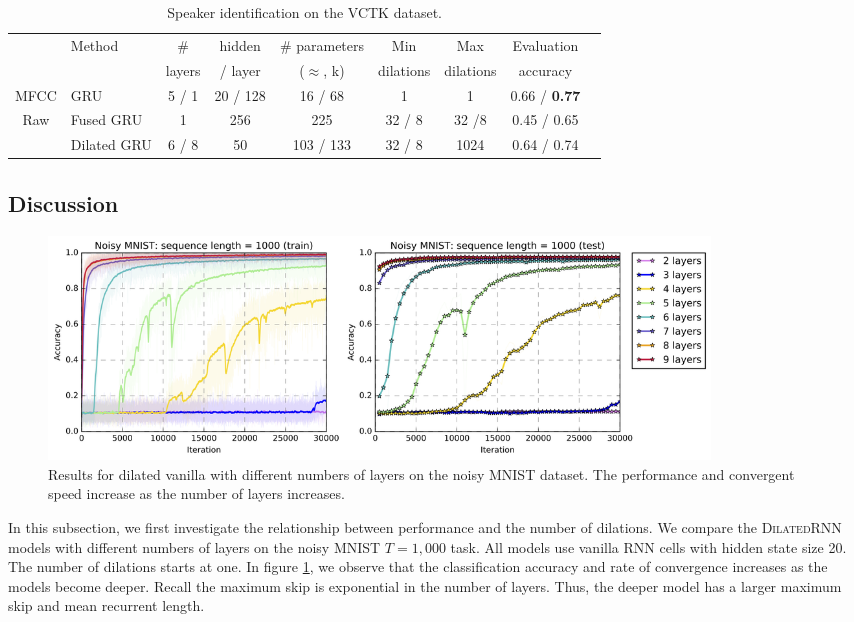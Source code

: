 \documentclass{article}
\newcommand{\algname}{\textsc{DilatedRNN }}
\begin{document}
\begin{table}[t]
\footnotesize
\centering
\caption{Speaker identification on the VCTK dataset.}
\label{table:speaker_id}
\begin{tabular}{llccccccc}
\hline
                                         & Method      & \#     & hidden   & \# parameters  & Min       & Max       & Evaluation  \\
                                         &             & layers & / layer  & ($\approx$, k) & dilations & dilations & accuracy    \\ \hline \hline
MFCC                                     & GRU & 5 / 1  & 20 / 128 & 16 / 68        & 1         & 1         & 0.66 / \textbf{0.77} \\
\multicolumn{1}{c}{\multirow{2}{*}{Raw}} & Fused GRU   & 1      & 256      & 225            & 32 / 8    & 32 /8     & 0.45 / 0.65 \\
\multicolumn{1}{c}{}                     & Dilated GRU & 6 / 8  & 50       & 103 / 133      & 32 / 8    & 1024      & 0.64 / 0.74 \\ \hline
\end{tabular}
\vspace*{-0.05in}
\end{table}

\subsection{Discussion}
\begin{figure}[t]
  \centering
  \includegraphics[width=0.85\textwidth]{./figure/increase.png}
  \vspace*{-0.05in}  
  \caption{Results for dilated vanilla with different numbers of layers on the noisy MNIST dataset.  The performance and convergent speed increase as the number of layers increases. }
  \label{fig:increase}
  \vspace*{-0.05in}
\end{figure}

In this subsection, we first investigate the relationship between performance and the number of dilations.  We compare the \algname models with different numbers of layers on the noisy MNIST $T = 1,000$ task.  All models use vanilla RNN cells with hidden state size 20.    The number of dilations starts at one.  In figure \ref{fig:increase}, we observe that the classification accuracy and rate of convergence increases as the models become deeper.  Recall the maximum skip is exponential in the number of layers.  Thus, the deeper model has a larger maximum skip and mean recurrent length.
\end{document}
